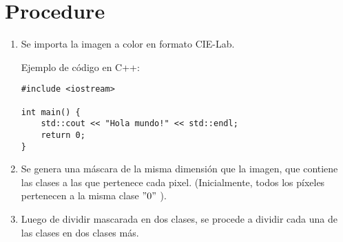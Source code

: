 \section{Procedure}\label{sec:procedure}
\begin{enumerate}
    \item Se importa la imagen a color en formato CIE-Lab.

    Ejemplo de código en C++:

    \begin{lstlisting}
#include <iostream>

int main() {
    std::cout << "Hola mundo!" << std::endl;
    return 0;
}
    \end{lstlisting}

    \item Se genera una máscara de la misma dimensión que la imagen, que contiene las clases a las que pertenece cada pixel.
    (Inicialmente, todos los píxeles pertenecen a la misma clase \("0"\) ).
    \item Luego de dividir mascarada en dos clases, se procede a dividir cada una de las clases en dos clases más.
\end{enumerate}
